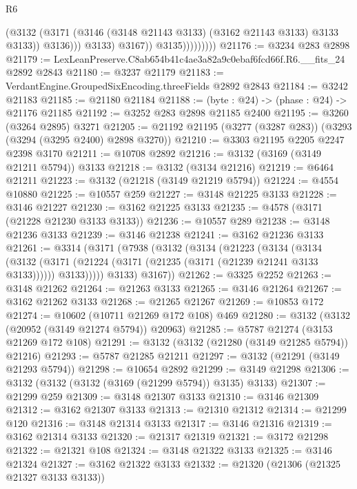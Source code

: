 \begin{lexlean}{R6}
\begin{coremodule}
                                (@3132
                                  (@3171
                                    (@3146 (@3148 @21143 @3133) (@3162 @21143 @3133) @3133 @3133))
                                  @3136)))
                            @3133)
                          @3167))
                      @3135)))))))))
@21176 := @3234 @283 @2898
@21179 := LexLeanPreserve.C8ab654b41c4ae3a82a9c0ebaf6fcd66f.R6.__fits_24 @2892 @2843
@21180 := @3237 @21179
@21183 := VerdantEngine.GroupedSixEncoding.threeFields @2892 @2843
@21184 := @3242 @21183
@21185 := @21180 @21184
@21188 := (byte : @24) -> (phase : @24) -> @21176 @21185
@21192 := @3252 @283 @2898 @21185 @2400
@21195 := @3260 (@3264 @2895) @3271
@21205 := @21192 @21195 (@3277 (@3287 @283)) (@3293 (@3294 (@3295 @2400) @2898 @3270))
@21210 := @3303 @21195 @2205 @2247 @2398 @3170
@21211 := @10708 @2892
@21216 := @3132 (@3169 (@3149 @21211 @5794)) @3133
@21218 := @3132 (@3134 @21216)
@21219 := @6464 @21211
@21223 := @3132 (@21218 (@3149 @21219 @5794))
@21224 := @4554 @10880
@21225 := @10557 @259
@21227 := @3148 @21225 @3133
@21228 := @3146 @21227
@21230 := @3162 @21225 @3133
@21235 := @4578 (@3171 (@21228 @21230 @3133 @3133))
@21236 := @10557 @289
@21238 := @3148 @21236 @3133
@21239 := @3146 @21238
@21241 := @3162 @21236 @3133
@21261 := @3314
    (@3171
      (@7938
        (@3132
          (@3134
            (@21223
              (@3134
                (@3134
                  (@3132
                    (@3171 (@21224 (@3171 (@21235 (@3171 (@21239 @21241 @3133 @3133))))))
                    @3133)))))
          @3133)
        @3167))
@21262 := @3325 @2252
@21263 := @3148 @21262
@21264 := @21263 @3133
@21265 := @3146 @21264
@21267 := @3162 @21262 @3133
@21268 := @21265 @21267
@21269 := @10853 @172
@21274 := @10602 (@10711 @21269 @172 @108) @469
@21280 := @3132 (@3132 (@20952 (@3149 @21274 @5794)) @20963)
@21285 := @5787 @21274 (@3153 @21269 @172 @108)
@21291 := @3132 (@3132 (@21280 (@3149 @21285 @5794)) @21216)
@21293 := @5787 @21285 @21211
@21297 := @3132 (@21291 (@3149 @21293 @5794))
@21298 := @10654 @2892
@21299 := @3149 @21298
@21306 := @3132 (@3132 (@3132 (@3169 (@21299 @5794)) @3135) @3133)
@21307 := @21299 @259
@21309 := @3148 @21307 @3133
@21310 := @3146 @21309
@21312 := @3162 @21307 @3133
@21313 := @21310 @21312
@21314 := @21299 @120
@21316 := @3148 @21314 @3133
@21317 := @3146 @21316
@21319 := @3162 @21314 @3133
@21320 := @21317 @21319
@21321 := @3172 @21298
@21322 := @21321 @108
@21324 := @3148 @21322 @3133
@21325 := @3146 @21324
@21327 := @3162 @21322 @3133
@21332 := @21320 (@21306 (@21325 @21327 @3133 @3133))

\end{coremodule}
\end{lexlean}
